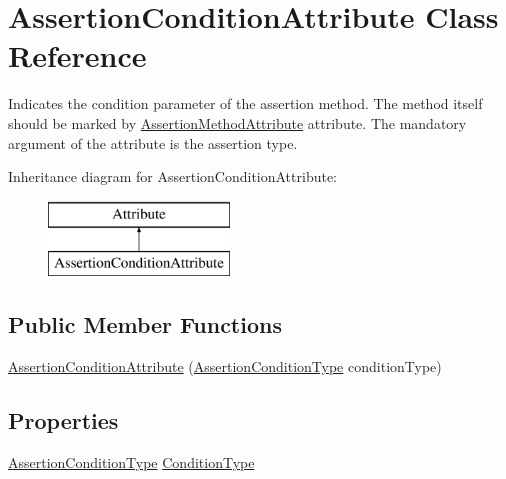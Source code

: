 \hypertarget{class_assertion_condition_attribute}{}\section{Assertion\+Condition\+Attribute Class Reference}
\label{class_assertion_condition_attribute}


Indicates the condition parameter of the assertion method. The method itself should be marked by \hyperlink{class_assertion_method_attribute}{Assertion\+Method\+Attribute} attribute. The mandatory argument of the attribute is the assertion type.  


Inheritance diagram for Assertion\+Condition\+Attribute\+:\begin{figure}[H]
\begin{center}
\leavevmode
\includegraphics[height=2.000000cm]{class_assertion_condition_attribute}
\end{center}
\end{figure}
\subsection*{Public Member Functions}
\begin{DoxyCompactItemize}
\item 
\hyperlink{class_assertion_condition_attribute_a9e8e78b2fe91bb29f18154940860af32}{Assertion\+Condition\+Attribute} (\hyperlink{_annotations_8cs_a016c132b1d3a6c75524ade006560e87d}{Assertion\+Condition\+Type} condition\+Type)
\end{DoxyCompactItemize}
\subsection*{Properties}
\begin{DoxyCompactItemize}
\item 
\hyperlink{_annotations_8cs_a016c132b1d3a6c75524ade006560e87d}{Assertion\+Condition\+Type} \hyperlink{class_assertion_condition_attribute_ad07b5dd15df52a5c307ed41dda8299ef}{Condition\+Type}
\end{DoxyCompactItemize}


